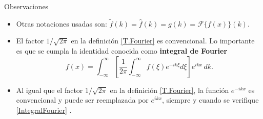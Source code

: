\begin{obs}{Observaciones}
    \begin{itemize}
        \item Otras notaciones usadas son: $\tilde{f}(k) = \hat{f}(k) = g(k) = \mathcal{F}\{f(x)\}(k)$.
        
        \item El factor $1/\sqrt{2\pi}$ en la definición \eqref{T.Fourier} es convencional. Lo importante es que se cumpla la identidad conocida como \textbf{integral de Fourier}
        \begin{equation}
            f(x) = \int_{-\infty}^{\infty} \left[\frac{1}{2\pi} \int_{-\infty}^{\infty} f(\xi) e^{-ik\xi} d\xi \right] e^{ikx} \,dk.
          \label{IntegralFourier}
        \end{equation}
       
    
        \item Al igual que el factor $1/\sqrt{2\pi}$ en la definición \eqref{T.Fourier}, la función $e^{-ikx}$ es convencional y puede ser reemplazada por $e^{ikx}$, siempre y cuando se verifique \eqref{IntegralFourier} \cite{Butkov, Riley}.
        
    
        
        

\end{itemize}
\end{obs}
